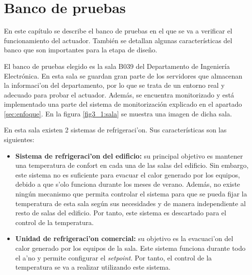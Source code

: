 \chapter{Banco de pruebas}\label{cap:bancopruebas}

	En este capítulo se describe el banco de pruebas en el que se va a verificar el funcionamiento del actuador. También se detallan algunas características del banco que son importantes para la etapa de diseño.

	El banco de pruebas elegido es la sala B039 del Departamento de Ingeniería Electrónica. En esta sala se guardan gran parte de los servidores que almacenan la informaci'on del departamento, por lo que se trata de un entorno real y adecuado para probar el actuador. Además, se encuentra monitorizado y está implementado una parte del sistema de monitorización explicado en el apartado \ref{sec:enfoque}. En la figura \ref{fig3_1:sala} se muestra una imagen de dicha sala.

En esta sala existen 2 sistemas de refrigeraci'on. Sus características son las siguientes:

\begin{itemize}
	\item\textbf{Sistema de refrigeraci'on del edificio:} su principal objetivo es mantener una temperatura de confort en cada una de las salas del edificio. Sin embargo, este sistema no es suficiente para evacuar el calor generado por los equipos, debido a que s'olo funciona durante los meses de verano. Además, no existe ningún mecanismo que permita controlar el sistema para que se pueda fijar la temperatura de esta sala según sus necesidades y de manera independiente al resto de salas del edificio. Por tanto, este sistema es descartado para el control de la temperatura.

	\item\textbf{Unidad de refrigeraci'on comercial:} su objetivo es la evacuaci'on del calor generado por los equipos de la sala. Este sistema funciona durante todo el a'no y permite configurar el \textit{setpoint}. Por tanto, el control de la temperatura se va a realizar utilizando este sistema.
\end{itemize}

